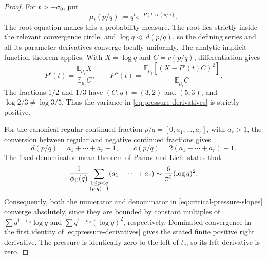 \begin{proof}
For \(t>-\sigma_0\), put
\[
 \mu_t(p/q):=q^t e^{-P(t)c(p/q)}.
\]
The root equation makes this a probability measure.  The root lies strictly
inside the relevant convergence circle, and
\(\log q\ll d(p/q)\), so the defining series and all its parameter
derivatives converge locally uniformly.  The analytic implicit-function
theorem applies.  With \(X=\log q\) and \(C=c(p/q)\), differentiation gives
\begin{equation}
 P'(t)=\frac{\mathbb E_{\mu_t}X}{\mathbb E_{\mu_t}C},
 \qquad
 P''(t)=
 \frac{\mathbb E_{\mu_t}[(X-P'(t)C)^2]}
      {\mathbb E_{\mu_t}C}.
 \label{eq:pressure-derivatives}
\end{equation}
The fractions \(1/2\) and \(1/3\) have \((C,q)=(3,2)\) and \((5,3)\),
and \(\log2/3\ne\log3/5\).  Thus the variance in
\eqref{eq:pressure-derivatives} is strictly positive.

For the canonical regular continued fraction
\(p/q=[0;a_1,\ldots,a_r]\), with \(a_r>1\), the conversion between regular
and negative continued fractions gives
\[
 d(p/q)=a_1+\cdots+a_r-1,
 \qquad c(p/q)=2(a_1+\cdots+a_r)-1.
\]
The fixed-denominator mean theorem of Panov and Liehl
\cite{Panov1982,Liehl1983,AistleitnerBordaHauke2023} states that
\[
 \frac1{\phi_{\rm E}(q)}
 \sum_{\substack{1\le p<q\\(p,q)=1}}(a_1+\cdots+a_r)
 \sim\frac6{\pi^2}(\log q)^2.
\]
Consequently, both the numerator and denominator in
\eqref{eq:critical-pressure-slopes} converge absolutely, since they are
bounded by constant multiples of
\(\sum q^{1-\sigma_0}\log q\) and
\(\sum q^{1-\sigma_0}(\log q)^2\), respectively.  Dominated convergence in
the first identity of \eqref{eq:pressure-derivatives} gives the stated finite
positive right derivative.  The pressure is identically zero to the left of
\(t_c\), so its left derivative is zero.
\end{proof}
\fi
